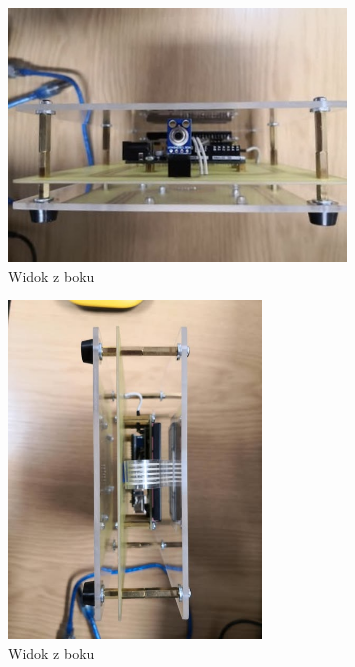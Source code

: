 \begin{figure}[h!]
    \centering
    \includegraphics[width=0.8\textwidth]{images/bok3.jpg}
    \caption{Widok z boku}
    \label{fig:widok_z_boku2}
\end{figure}

\begin{figure}[h!]
    \centering
    \includegraphics[width=0.6\textwidth]{images/bok4.jpg}
    \caption{Widok z boku}
    \label{fig:widok_z_boku}
\end{figure}

